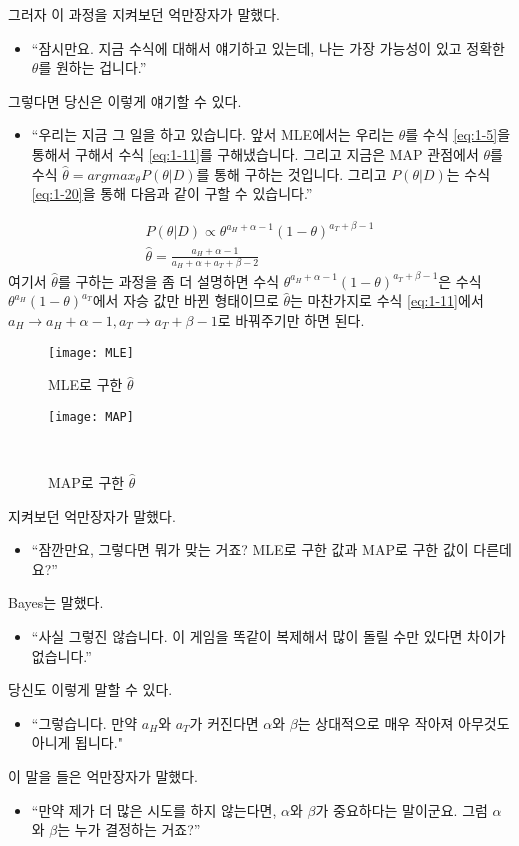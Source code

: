 \documentclass[a4paper]{oblivoir}
\begin{document}
\noindent 그러자 이 과정을 지켜보던 억만장자가 말했다.
\begin{itemize}
\item``잠시만요. 지금 수식에 대해서 얘기하고 있는데, 나는 가장 가능성이 있고 정확한 $\theta$를 원하는 겁니다.''
\end{itemize}
그렇다면 당신은 이렇게 얘기할 수 있다.
\begin{itemize}
\item``우리는 지금 그 일을 하고 있습니다. 앞서 MLE에서는 우리는 $\theta$를 수식 \eqref{eq:1-5}을 통해서 구해서 수식 \eqref{eq:1-11}를 구해냈습니다. 그리고 지금은 MAP 관점에서 $\theta$를 수식 $\hat{\theta}=argmax_{\theta}P(\theta| D)$를 통해 구하는 것입니다. 그리고 $P(\theta| D)$는 수식 \eqref{eq:1-20}을 통해 다음과 같이 구할 수 있습니다.''
\end{itemize}
\begin{align}
P(\theta| D)\propto \theta^{a_H+\alpha-1}(1-\theta)^{a_T+\beta-1}\\
\hat{\theta}=\frac{a_H+\alpha-1}{a_H+\alpha+a_T+\beta-2}
\end{align}
\indent 여기서 $\hat{\theta}$를 구하는 과정을 좀 더 설명하면 수식 $\theta^{a_H+\alpha-1}(1-\theta)^{a_T+\beta-1}$은 수식 $\theta^{a_H}(1-\theta)^{a_T}$에서 자승 값만 바뀐 형태이므로 $\hat{\theta}$는 마찬가지로 수식 \eqref{eq:1-11}에서\\ ${a_H}\rightarrow{a_H+\alpha-1}, {a_T}\rightarrow{a_T+\beta-1}$로 바꿔주기만 하면 된다.

\begin{figure}[ht]\centering
\parbox[t]{4cm}{\texttt{[image: MLE]}\caption{MLE로 구한 $\hat{\theta}$}\label{Fig:1-20}}\hspace{1cm}
\parbox[t]{4cm}{\texttt{[image: MAP]}\caption{MAP로 구한 $\hat{\theta}$}\label{Fig:1-21}}\\
\end{figure}
\noindent 지켜보던 억만장자가 말했다.
\begin{itemize}
\item``잠깐만요, 그렇다면 뭐가 맞는 거죠? MLE로 구한 값과 MAP로 구한 값이 다른데요?''
\end{itemize}
Bayes는 말했다.
\begin{itemize}
\item``사실 그렇진 않습니다. 이 게임을 똑같이 복제해서 많이 돌릴 수만 있다면 차이가 없습니다.''
\end{itemize}
당신도 이렇게 말할 수 있다.
\begin{itemize}
\item``그렇습니다. 만약 $a_H$와 $a_T$가 커진다면 $\alpha$와 $\beta$는 상대적으로 매우 작아져 아무것도 아니게 됩니다."
\end{itemize}
이 말을 들은 억만장자가 말했다.
\begin{itemize}
\item``만약 제가 더 많은 시도를 하지 않는다면, $\alpha$와 $\beta$가 중요하다는 말이군요. 그럼 $\alpha$와 $\beta$는 누가 결정하는 거죠?''\\
\end{itemize}
\end{document}
